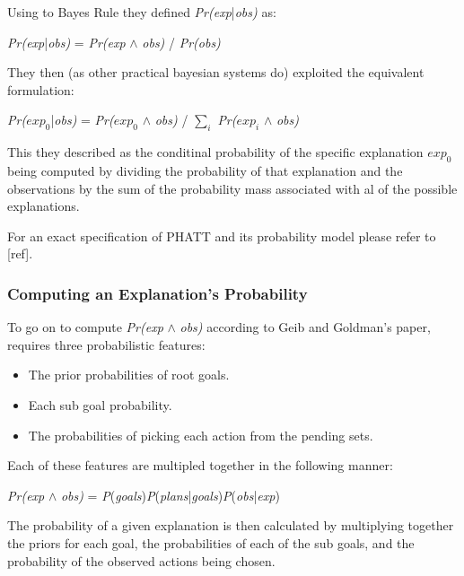 \documentclass[parskip]{cs4rep}
\begin{document}
Using to Bayes Rule they defined \textit{Pr(exp}|\textit{obs)} as:\newline

\centerline{
\textit{Pr(exp}|\textit{obs)} = \textit{Pr(exp} $\wedge$ \textit{obs)} / \textit{Pr(obs)}
}

They then (as other practical bayesian systems do) exploited the equivalent formulation:\newline

\centerline{
\textit{Pr($exp_0$}|\textit{obs)} = \textit{Pr($exp_0$} $\wedge$ \textit{obs)} / $\displaystyle\sum\nolimits_{i}$ \textit{Pr($exp_i$} $\wedge$ \textit{obs)}
}

This they described as the conditinal probability of the specific explanation $exp_0$ being computed by dividing the probability of that explanation and the observations by the sum of the probability mass associated with al of the possible explanations.

For an exact specification of PHATT and its probability model please refer to [ref].

\subsubsection{Computing an Explanation's Probability}

To go on to compute \textit{Pr(exp} $\wedge$ \textit{obs)} according to Geib and Goldman's paper, requires three probabilistic features:\newline

\begin{itemize}
\item
The prior probabilities of root goals.
\item
Each sub goal probability.
\item
The probabilities of picking each action from the pending sets.\newline
\end{itemize}

Each of these features are multipled together in the following manner:\newline

\centerline{
\textit{Pr(exp} $\wedge$ \textit{obs)} = \textit{P}(\textit{goals})\textit{P}(\textit{plans}|\textit{goals})\textit{P}(\textit{obs}|\textit{exp})
}

The probability of a given explanation is then calculated by multiplying together the priors for each goal, the probabilities of each of the sub goals, and the probability of the observed actions being chosen.
\end{document}
